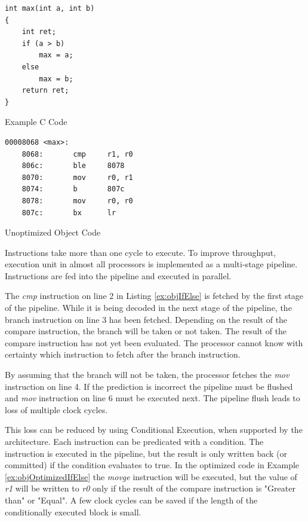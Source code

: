 \begin{Example}[h]
\begin{lstlisting}
int max(int a, int b)
{
    int ret;
    if (a > b)
        max = a;
    else
        max = b;
    return ret;
}
\end{lstlisting}
\caption{Example C Code}
\label{ex:cIfElse}
\end{Example}

\begin{Example}[h]
\begin{lstlisting}
00008068 <max>:
    8068:       cmp     r1, r0
    806c:       ble     8078   
    8070:       mov     r0, r1
    8074:       b       807c
    8078:       mov     r0, r0
    807c:       bx      lr
\end{lstlisting}
\caption{Unoptimized Object Code}
\label{ex:objIfElse}
\end{Example}

Instructions take more than one cycle to execute. To improve throughput, execution unit in almost all processors is implemented as a multi-stage pipeline. Instructions are fed into the pipeline and executed in parallel.

The \emph{cmp} instruction on line 2 in Listing \ref{ex:objIfElse} is fetched by the first stage of the pipeline. While it is being decoded in the next stage of the pipeline, the branch instruction on line 3 has been fetched. Depending on the result of the compare instruction, the branch will be taken or not taken. The result of the compare instruction has not yet been evaluated. The processor cannot know with certainty which instruction to fetch after the branch instruction.

By assuming that the branch will not be taken, the processor fetches the \emph{mov} instruction on line 4. If the prediction is incorrect the pipeline must be flushed and \emph{mov} instruction on line 6 must be executed next. The pipeline flush leads to loss of multiple clock cycles.

This loss can be reduced by using Conditional Execution, when supported by the architecture. Each instruction can be predicated with a condition. The instruction is executed in the pipeline, but the result is only written back (or committed) if the condition evaluates to true. In the optimized code in Example \ref{ex:objOptimizedIfElse} the \emph{movge} instruction will be executed, but the value of \emph{r1} will be written to \emph{r0} only if the result of the compare instruction is "Greater than" or "Equal". A few clock cycles can be saved if the length of the conditionally executed block is small.

